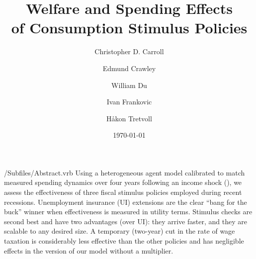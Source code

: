\documentclass[HAFiscal]{subfiles}
\begin{document}

\title{Welfare and Spending Effects \\ of Consumption Stimulus Policies}

\author{Christopher D. Carroll\authNum \and Edmund Crawley\authNum \and William Du\authNum \and Ivan Frankovic\authNum \and H{\aa}kon Tretvoll\authNum}

\keywords{}


\date{\today}


\maketitle

\hypertarget{abstract}{}
\begin{verbatimwrite}{\econtexRoot/Subfiles/Abstract.vrb}
  Using a heterogeneous agent model calibrated to match measured spending dynamics over four years following an income shock (\cite{fagereng_mpc_2021}), we assess the effectiveness of three fiscal stimulus policies employed during recent recessions.  Unemployment insurance (UI) extensions are the clear ``bang for the buck'' winner when effectiveness is measured in utility terms.  Stimulus checks are second best and have two advantages (over UI): they arrive faster, and they are scalable to any desired size.  A temporary (two-year) cut in the rate of wage taxation is considerably less effective than the other policies and has negligible effects in the version of our model without a multiplier.
\end{verbatimwrite}


\hypertarget{links}{}
\end{document}
